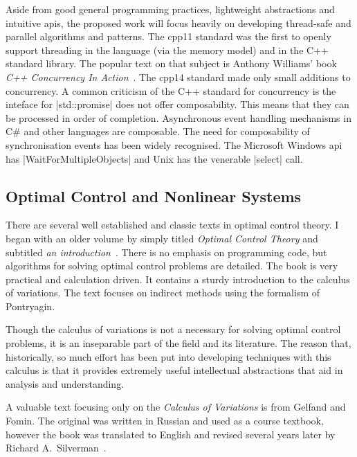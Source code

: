 Aside from good general programming practices, lightweight abstractions and
intuitive \acp{api}, the proposed work will focus heavily on developing
thread-safe and parallel algorithms and patterns. The \ac{cpp11} standard was
the first to openly support threading in the language (via the memory model) and
in the C++ standard library. The popular text on that subject is Anthony
Williams' book \emph{C++ Concurrency In Action}~\cite{Williams2012}. The
\ac{cpp14} standard made only small additions to concurrency. A common criticism of
the C++ standard for concurrency is the inteface for |std::promise| does not
offer composability. This means that they can be processed in order of
completion. Asynchronous event handling mechanisms in C\# and other languages
are composable. The need for composability of synchronisation events has been
widely recognised. The Microsoft Windows \ac{api} has |WaitForMultipleObjects|
and Unix has the venerable |select| call.



\subsection{Optimal Control and Nonlinear Systems}


There are several well established and classic texts in optimal control theory.
I began with an older volume by \citeauthor{Kirk2004} simply titled
\emph{Optimal Control Theory} and subtitled \emph{an
introduction}~\cite{Kirk2004}. There is no emphasis on programming code, but
algorithms for solving optimal control problems are detailed. The book is very
practical and calculation driven. It contains a sturdy introduction to the
calculus of variations. The text focuses on indirect methods using the formalism
of Pontryagin.

Though the calculus of variations is not a necessary for solving optimal control
problems, it is an inseparable part of the field and its literature. The reason
that, historically, so much effort has been put into developing techniques with
this calculus is that it provides extremely useful intellectual abstractions
that aid in analysis and understanding.

A valuable text focusing only on the \emph{Calculus of Variations} is from
Gelfand and Fomin. The original was written in Russian and used as a course
textbook, however the book was translated to English and revised several years
later by Richard A.\ Silverman~\cite{gelfand2000calculus}.

